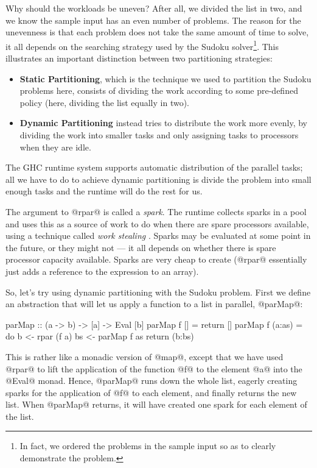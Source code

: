 Why should the workloads be uneven?  After all, we divided the list in
two, and we know the sample input has an even number of problems.  The
reason for the unevenness is that each problem does not take the same
amount of time to solve, it all depends on the searching strategy used
by the Sudoku solver\footnote{In fact, we ordered the problems in the
  sample input so as to clearly demonstrate the problem.}.  This
illustrates an important distinction between two partitioning
strategies:

\begin{itemize}
\item \textbf{Static Partitioning}, which is the technique we used to
  partition the Sudoku problems here, consists of dividing the work
  according to some pre-defined policy (here, dividing the list
  equally in two).

\item \textbf{Dynamic Partitioning} instead tries to distribute the
  work more evenly, by dividing the work into smaller tasks and only
  assigning tasks to processors when they are idle.
\end{itemize}

The GHC runtime system supports automatic distribution of the parallel
tasks; all we have to do to achieve dynamic partitioning is divide the
problem into small enough tasks and the runtime will do the rest for
us.

The argument to @rpar@ is called a \emph{spark}.  The runtime collects
sparks in a pool and uses this as a source of work to do when there
are spare processors available, using a technique called \emph{work
  stealing} \cite{multicore-ghc-09}.  Sparks may be evaluated at some
point in the future, or they might not --- it all depends on whether
there is spare processor capacity available.  Sparks are very cheap to
create (@rpar@ essentially just adds a reference to the expression to
an array).

So, let's try using dynamic partitioning with the Sudoku problem.
First we define an abstraction that will let us apply a function to a
list in parallel, @parMap@:

\begin{numhaskell}
parMap :: (a -> b) -> [a] -> Eval [b]
parMap f [] = return []
parMap f (a:as) = do
   b <- rpar (f a)
   bs <- parMap f as
   return (b:bs)
\end{numhaskell}

\noindent This is rather like a monadic version of @map@, except that
we have used @rpar@ to lift the application of the function @f@ to the
element @a@ into the @Eval@ monad.  Hence, @parMap@ runs down the
whole list, eagerly creating sparks for the application of @f@ to each
element, and finally returns the new list.  When @parMap@ returns, it
will have created one spark for each element of the list.

